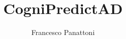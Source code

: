 \documentclass[11pt]{article}
\author{Francesco Panattoni}
\title{CogniPredictAD}
\begin{document}
	

	\tableofcontents
	\newpage
	
	\begin{multicols}{2}
		
		
		
		
	\end{multicols}	
	
\end{document}
